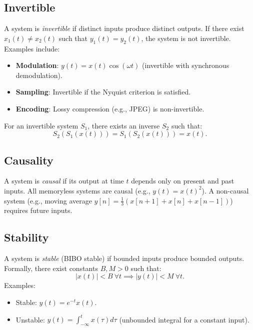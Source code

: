 \subsection{Invertible}
A system is \emph{invertible} if distinct inputs produce distinct outputs. If there exist \( x_1(t) \neq x_2(t) \) such that \( y_1(t) = y_2(t) \), the system is not invertible. Examples include:
\begin{itemize}
    \item \textbf{Modulation}: \( y(t) = x(t)\cos(\omega t) \) (invertible with synchronous demodulation).
    \item \textbf{Sampling}: Invertible if the Nyquist criterion is satisfied.
    \item \textbf{Encoding}: Lossy compression (e.g., JPEG) is non-invertible.
\end{itemize}
For an invertible system \( S_1 \), there exists an inverse \( S_2 \) such that:
\[
    S_2(S_1(x(t))) = S_1(S_2(x(t))) = x(t).
\]

\subsection{Causality}
A system is \emph{causal} if its output at time \( t \) depends only on present and past inputs. All memoryless systems are causal (e.g., \( y(t) = x(t)^2 \)). A non-causal system (e.g., moving average \( y[n] = \frac{1}{3}(x[n+1] + x[n] + x[n-1]) \)) requires future inputs.

\subsection{Stability}
A system is \emph{stable} (BIBO stable) if bounded inputs produce bounded outputs. Formally, there exist constants \( B, M > 0 \) such that:
\[
    |x(t)| < B \ \forall t \implies |y(t)| < M \ \forall t.
\]
Examples:
\begin{itemize}
    \item Stable: \( y(t) = e^{-t}x(t) \).
    \item Unstable: \( y(t) = \int_{-\infty}^t x(\tau) d\tau \) (unbounded integral for a constant input).
\end{itemize}